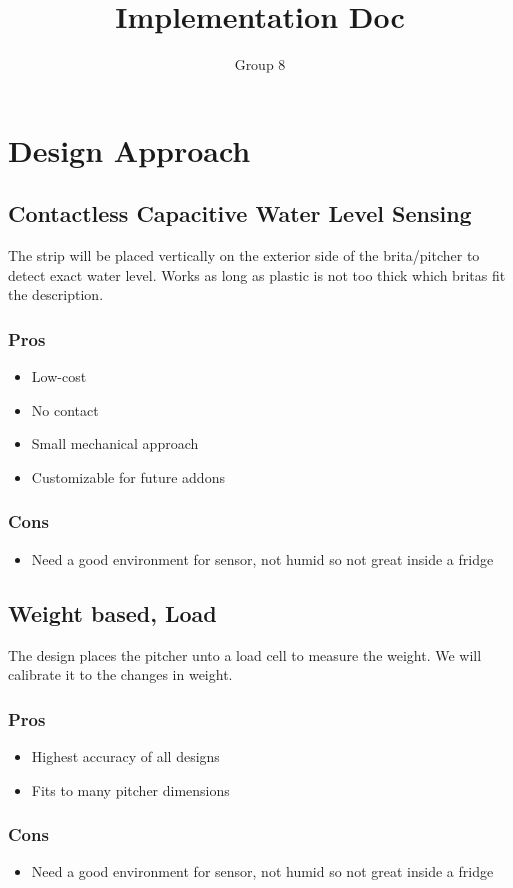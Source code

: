 \documentclass[12pt]{article}
\title{Implementation Doc}
\author{Group 8}
\begin{document}
\pagestyle{fancy}
\section{Design Approach}
\subsection{Contactless Capacitive Water Level Sensing}
The strip will be placed vertically on the exterior side of the brita/pitcher to detect exact water level. 
Works as long as plastic is not too thick which britas fit the description. 

\subsubsection{Pros}
    \begin{itemize}
    \item Low-cost
    \item No contact
    \item Small mechanical approach
    \item Customizable for future addons
    \end{itemize}
\subsubsection{Cons}
    \begin{itemize}
    \item Need a good environment for sensor, not humid so not great inside a fridge
    \end{itemize}

\subsection{Weight based, Load}
The design places the pitcher unto a load cell to measure the weight. We will calibrate it to the changes in weight.
\subsubsection{Pros}
    \begin{itemize}
    \item Highest accuracy of all designs
    \item Fits to many pitcher dimensions
    \end{itemize}
\subsubsection{Cons}
    \begin{itemize}
    \item Need a good environment for sensor, not humid so not great inside a fridge
    \end{itemize}
\end{document}
